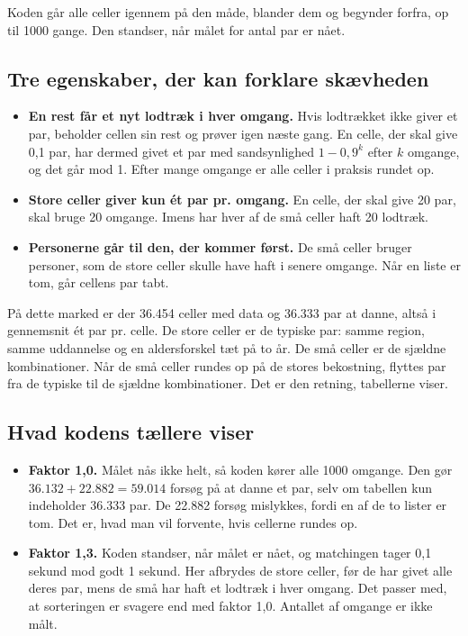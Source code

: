 \documentclass[11pt,a4paper]{article}
\begin{document}
Koden går alle celler igennem på den måde, blander dem og begynder forfra, op til 1000 gange. Den
standser, når målet for antal par er nået.

\subsection{Tre egenskaber, der kan forklare skævheden}

\begin{itemize}
\item \textbf{En rest får et nyt lodtræk i hver omgang.} Hvis lodtrækket ikke giver et par, beholder
cellen sin rest og prøver igen næste gang. En celle, der skal give 0,1 par, har dermed givet et par
med sandsynlighed $1-0{,}9^k$ efter $k$ omgange, og det går mod 1. Efter mange omgange er alle celler
i praksis rundet op.
\item \textbf{Store celler giver kun ét par pr. omgang.} En celle, der skal give 20 par, skal bruge
20 omgange. Imens har hver af de små celler haft 20 lodtræk.
\item \textbf{Personerne går til den, der kommer først.} De små celler bruger personer, som de store
celler skulle have haft i senere omgange. Når en liste er tom, går cellens par tabt.
\end{itemize}

På dette marked er der 36.454 celler med data og 36.333 par at danne, altså i gennemsnit ét par pr.
celle. De store celler er de typiske par: samme region, samme uddannelse og en aldersforskel tæt på
to år. De små celler er de sjældne kombinationer. Når de små celler rundes op på de stores
bekostning, flyttes par fra de typiske til de sjældne kombinationer. Det er den retning, tabellerne
viser.

\subsection{Hvad kodens tællere viser}

\begin{itemize}
\item \textbf{Faktor 1,0.} Målet nås ikke helt, så koden kører alle 1000 omgange. Den gør
$36.132+22.882=59.014$ forsøg på at danne et par, selv om tabellen kun indeholder 36.333 par. De
22.882 forsøg mislykkes, fordi en af de to lister er tom. Det er, hvad man vil forvente, hvis
cellerne rundes op.
\item \textbf{Faktor 1,3.} Koden standser, når målet er nået, og matchingen tager 0,1 sekund mod godt
1 sekund. Her afbrydes de store celler, før de har givet alle deres par, mens de små har haft et
lodtræk i hver omgang. Det passer med, at sorteringen er svagere end med faktor 1,0. Antallet af
omgange er ikke målt.
\end{itemize}
\end{document}
